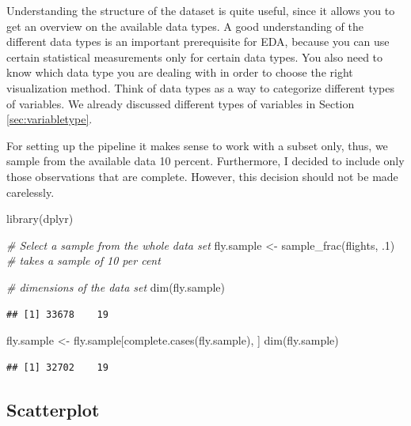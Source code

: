 \documentclass[
]{book}
\newenvironment{Shaded}{\begin{snugshade}}{\end{snugshade}}
\newcommand{\CommentTok}[1]{\textcolor[rgb]{0.56,0.35,0.01}{\textit{#1}}}
\newcommand{\DecValTok}[1]{\textcolor[rgb]{0.00,0.00,0.81}{#1}}
\newcommand{\FunctionTok}[1]{\textcolor[rgb]{0.00,0.00,0.00}{#1}}
\newcommand{\NormalTok}[1]{#1}
\newcommand{\OtherTok}[1]{\textcolor[rgb]{0.56,0.35,0.01}{#1}}
\begin{document}
Understanding the structure of the dataset is quite useful, since it allows you to get an overview on the available data types. A good understanding of the different data types is an important prerequisite for EDA, because you can use certain statistical measurements only for certain data types. You also need to know which data type you are dealing with in order to choose the right visualization method. Think of data types as a way to categorize different types of variables. We already discussed different types of variables in Section \ref{sec:variabletype}.

For setting up the pipeline it makes sense to work with a subset only, thus, we sample from the available data 10 percent. Furthermore, I decided to include only those observations that are complete. However, this decision should not be made carelessly.

\begin{Shaded}
\begin{Highlighting}[]
\FunctionTok{library}\NormalTok{(dplyr)}

\CommentTok{\# Select a sample from the whole data set}
\NormalTok{fly.sample }\OtherTok{\textless{}{-}} \FunctionTok{sample\_frac}\NormalTok{(flights, .}\DecValTok{1}\NormalTok{) }\CommentTok{\# takes a sample of 10 per cent}

\CommentTok{\# dimensions of the data set}
\FunctionTok{dim}\NormalTok{(fly.sample) }
\end{Highlighting}
\end{Shaded}

\begin{verbatim}
## [1] 33678    19
\end{verbatim}

\begin{Shaded}
\begin{Highlighting}[]
\NormalTok{fly.sample }\OtherTok{\textless{}{-}}\NormalTok{ fly.sample[}\FunctionTok{complete.cases}\NormalTok{(fly.sample), ]}
\FunctionTok{dim}\NormalTok{(fly.sample)}
\end{Highlighting}
\end{Shaded}

\begin{verbatim}
## [1] 32702    19
\end{verbatim}

\hypertarget{scatterplot}{%
\subsection{Scatterplot}\label{scatterplot}}
\end{document}
